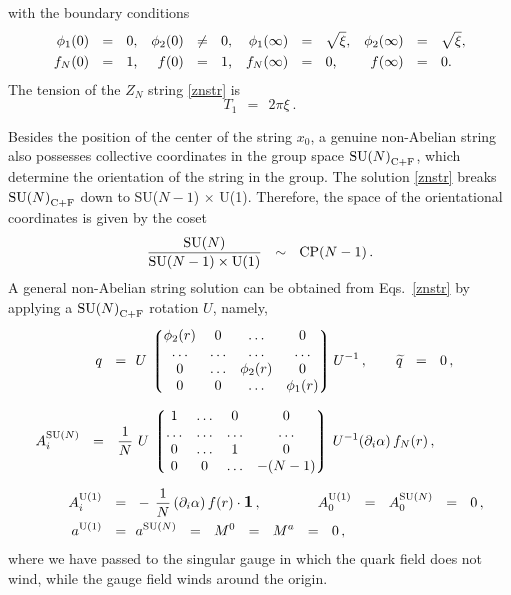 \documentclass[12pt]{article}
\def\beq{\begin{equation}}
\def\eeq{\end{equation}}
\newcommand{\p}{\partial}
\newcommand{\wt}{\widetilde}
\newcommand{\lgr}{\left\lgroup}
\newcommand{\rgr}{\right\rgroup}
\def\cfl {$\text{SU($N$)}_{\rm C+F}$ }
\def\cfln {$\text{SU($N$)}_{\rm C+F}$}
\newcommand{\aU}{a^{\rm U(1)}}
\newcommand{\aN}{a^\text{SU($N$)}}
\begin{document}
	with the boundary conditions
\begin{align}
%
\label{boundary}
	\phi_1(0) & ~~=~~  0\text,                   & \phi_2(0) & ~~\neq~~ 0\text,  &
	\phi_1(\infty) & ~~=~~ \sqrt{\xi} \text,     & \phi_2(\infty) & ~~=~~ \sqrt{\xi}\text, \\
%
\notag
	f_{N}(0) & ~~=~~ 1\text,                   & f(0) & ~~=~~ 1\text,   &
	f_{N}(\infty) & ~~=~~ 0 \text,            &  f(\infty) & ~~=~~ 0\text.
\end{align}
	The tension of the $ Z_N $ string \eqref{znstr} is 
\[
	T_1  ~~=~~ 2\pi\xi~.
\]
	
	Besides the position of the center of the string $ x_0 $, a genuine non-Abelian string 
	also possesses collective coordinates in the group space \cfln, which determine the orientation 
	of the string in the group.	
	The solution \eqref{znstr} breaks \cfl down to SU($N-1$) $\times$ U(1).
	Therefore, the space of the orientational coordinates is given by the coset
\beq
\label{modulispace}
	\frac{\text{SU($N$)}}
            {\text{SU($N-1$)} \times {\rm U(1)}}         ~~\sim~~  \text{CP($N-1$)}\,.
\eeq
	A general non-Abelian string solution can be obtained from Eqs.~\eqref{znstr} by applying
	a \cfl rotation $ U $, namely,
\begin{align}
%
\notag
	q ~~=~~ & U\, \lgr \begin{matrix}
			   	\phi_2(r)  & 0  & \ldots & 0 \\
				\ldots  &  \ldots & \ldots & \ldots \\
				0  & \ldots      & \phi_2(r) &  0 \\
				0  & 0           & \ldots  &  \phi_1(r) 
			   \end{matrix}        \rgr     
			U^{-1} \,,
		\qquad \wt{q} ~~=~~ 0\,,
		\\[2mm]
%
\label{nastr}
%
	A_i^\text{SU($N$)} ~~=~~ \frac{1}{N}\, &\, U\, \lgr \begin{matrix}
					          	1  & \ldots & 0 & 0 \\
						  	\ldots & \ldots & \ldots & \ldots \\
							0  & \ldots  & 1  &  0 \\
							0  & 0   & \ldots  &  - (N-1) 
					         \end{matrix} \rgr  \, U^{-1} (\p_i \alpha)\, f_{N}(r)\,,  \\[2mm]
%
\notag
	A_i^{\rm U(1)} ~~=~~ & -\,\frac{1}{N}\, (\p_i \alpha)\, f(r) \cdot \mathlarger{\mathbf{1}}\,,
	\qquad\qquad
			A_0^{\rm U(1)} ~~=~~ A_0^\text{SU($N$)} ~~=~~ 0\,,
	\\
%
\notag
	\aU ~~=~~ & \aN ~~=~~ M^0 ~~=~~ M^a ~~=~~ 0\,,
\end{align}
	where we have passed to the singular gauge in which the quark field does not wind, while the
	gauge field winds around the origin.
\end{document}
